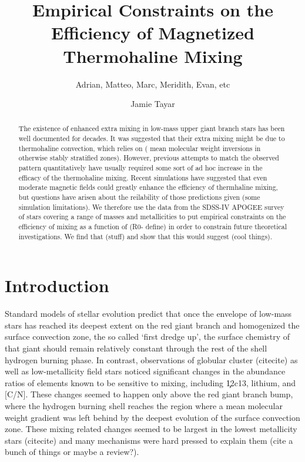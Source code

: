 \documentclass[linenumbers,twocolumn]{aastex62}
\begin{document}
\title{Empirical Constraints on the Efficiency of Magnetized Thermohaline Mixing}

\author{Adrian, Matteo, Marc, Meridith, Evan, etc}

\author[0000-0002-4818-7885]{Jamie Tayar}


\begin{abstract}
The existence of enhanced extra mixing in low-mass upper giant branch stars has been well documented for decades. It was suggested that their extra mixing might be due to thermohaline convection, which relies on ( mean molecular weight inversions in otherwise stably stratified zones). However, previous attempts to match the observed pattern quantitatively have usually required some sort of ad hoc increase in the efficacy of the thermohaline mixing. Recent simulations have suggested that even moderate magnetic fields could greatly enhance the efficiency of thermhaline mixing, but questions have arisen about the reilability of those predictions given (some simulation limitations). We therefore use the data from the SDSS-IV APOGEE survey of stars covering a range of masses and metallicities to put empirical constraints on the efficiency of mixing as a function of (R0- define) in order to constrain future theoretical investigations. We find that (stuff) and show that this would suggest (cool things).  
\end{abstract}


\section{Introduction}
\setcounter{footnote}{0}

Standard models of stellar evolution predict that once the envelope of low-mass stars has reached its deepest extent on the red giant branch and homogenized the surface convection zone, the so called `first dredge up', the surface chemistry of that giant should remain relatively constant through the rest of the shell hydrogen burning phase. In contrast, observations of globular cluster (citecite) as well as low-metallicity field stars \citep{Gratton2000} noticed significant changes in the abundance ratios of elements known to be sensitive to mixing, including \c12c13, lithium, and [C/N]. These changes seemed to happen only above the red giant branch bump, where the hydrogen burning shell reaches the region where a mean molecular weight gradient was left behind by the deepest evolution of the surface convection zone. These mixing related changes seemed to be largest in the lowest metallicity stars (citecite) and many mechanisms were hard pressed to explain them (cite a bunch of things or maybe a review?). 
\end{document}
